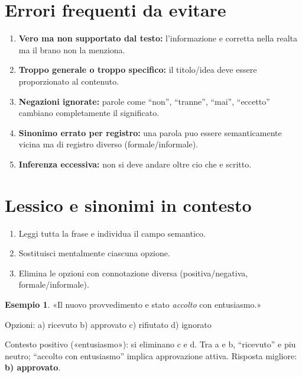 \documentclass[12pt, a4paper, twoside, openright]{book}
\theoremstyle{definition}
\newtheorem{esempio}{Esempio}[section]
\begin{document}
\section{Errori frequenti da evitare}

\begin{attenzione}
\begin{enumerate}
  \item \textbf{Vero ma non supportato dal testo:} l'informazione e corretta nella realta ma il brano non la menziona.
  \item \textbf{Troppo generale o troppo specifico:} il titolo/idea deve essere proporzionato al contenuto.
  \item \textbf{Negazioni ignorate:} parole come ``non'', ``tranne'', ``mai'', ``eccetto'' cambiano completamente il significato.
  \item \textbf{Sinonimo errato per registro:} una parola puo essere semanticamente vicina ma di registro diverso (formale/informale).
  \item \textbf{Inferenza eccessiva:} non si deve andare oltre cio che e scritto.
\end{enumerate}
\end{attenzione}

\section{Lessico e sinonimi in contesto}

\begin{defbox}
\begin{enumerate}
  \item Leggi tutta la frase e individua il campo semantico.
  \item Sostituisci mentalmente ciascuna opzione.
  \item Elimina le opzioni con connotazione diversa (positiva/negativa, formale/informale).
\end{enumerate}
\end{defbox}

\begin{esempio}
«Il nuovo provvedimento e stato \emph{accolto} con entusiasmo.»

Opzioni: a) ricevuto \quad b) approvato \quad c) rifiutato \quad d) ignorato

Contesto positivo («entusiasmo»): si eliminano c e d.
Tra a e b, ``ricevuto'' e piu neutro; ``accolto con entusiasmo'' implica approvazione attiva.
Risposta migliore: \textbf{b) approvato}.
\end{esempio}
\end{document}
